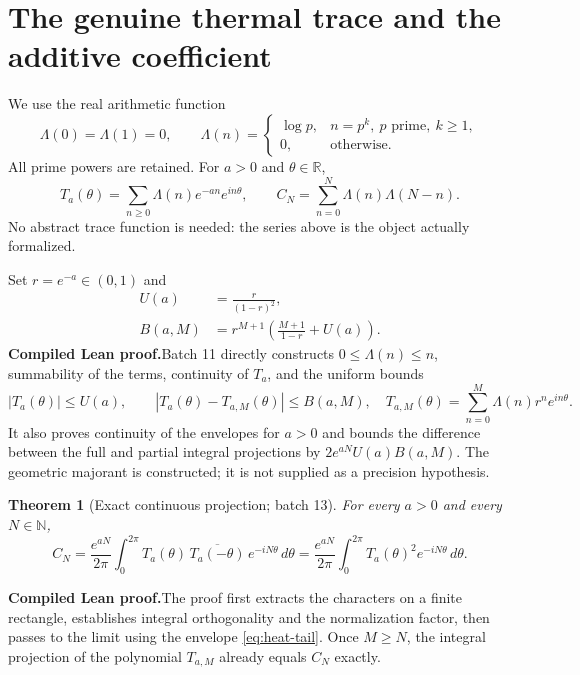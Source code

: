 \documentclass[11pt,a4paper]{article}
\newtheorem{theorem}{Theorem}[section]
\theoremstyle{remark}
\newcommand{\Lam}{\Lambda}
\newcommand{\R}{\mathbb R}
\newcommand{\N}{\mathbb N}
\newcommand{\paid}{\textbf{Compiled Lean proof.}\space}
\begin{document}
\clearpage
\section{The genuine thermal trace and the additive coefficient}\label{sec:heat}
We use the real arithmetic function
\[
\Lam(0)=\Lam(1)=0,\qquad
\Lam(n)=\begin{cases}\log p,&n=p^k,\ p\text{ prime},\ k\ge1,\\0,&\text{otherwise}.
\end{cases}
\]
All prime powers are retained. For $a>0$ and $\theta\in\R$,
\begin{equation}\label{eq:heat}
T_a(\theta)=\sum_{n\ge0}\Lam(n)e^{-an}e^{in\theta},\qquad
C_N=\sum_{n=0}^{N}\Lam(n)\Lam(N-n).
\end{equation}
No abstract trace function is needed: the series above is the object
actually formalized.

Set $r=e^{-a}\in(0,1)$ and
\begin{align}
U(a)&=\frac{r}{(1-r)^2},\label{eq:U}\\
B(a,M)&=r^{M+1}\left(\frac{M+1}{1-r}+U(a)\right).
\label{eq:heat-tail}
\end{align}
\paid Batch 11 directly constructs $0\le\Lam(n)\le n$, summability
of the terms, continuity of $T_a$, and the uniform bounds
\[
|T_a(\theta)|\le U(a),\qquad
|T_a(\theta)-T_{a,M}(\theta)|\le B(a,M),
\quad T_{a,M}(\theta)=\sum_{n=0}^{M}\Lam(n)r^ne^{in\theta}.
\]
It also proves continuity of the envelopes for $a>0$ and bounds the difference
between the full and partial integral projections by
$2e^{aN}U(a)B(a,M)$. The geometric majorant is constructed; it is not
supplied as a precision hypothesis.

\begin{theorem}[Exact continuous projection; batch 13]\label{thm:circle}
For every $a>0$ and every $N\in\N$,
\begin{equation}\label{eq:circle}
C_N=\frac{e^{aN}}{2\pi}\int_0^{2\pi}
T_a(\theta)\,\overline{T_a(-\theta)}\,e^{-iN\theta}\,d\theta
=\frac{e^{aN}}{2\pi}\int_0^{2\pi}T_a(\theta)^2e^{-iN\theta}\,d\theta.
\end{equation}
\end{theorem}
\paid The proof first extracts the characters on a finite rectangle,
establishes integral orthogonality and the normalization factor, then passes
to the limit using the envelope \eqref{eq:heat-tail}. Once $M\ge N$, the
integral projection of the polynomial $T_{a,M}$ already equals $C_N$ exactly.
\end{document}
